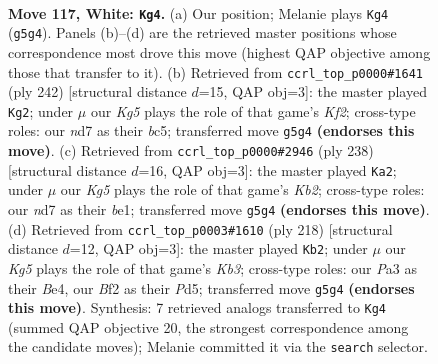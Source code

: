 \documentclass[11pt]{article}
\begin{document}
\clearpage

\begin{figure}[p]\centering
\begin{subfigure}{0.46\textwidth}\centering
\resizebox{\linewidth}{!}{%
\newchessgame
\chessboard[
  setfen={7k/3n4/8/5PK1/p6P/P7/5B2/8 w - - 1 117},
  showmover=false,
  pgfstyle=straightmove, color=movearrow, markmove={g5-g4}
]}
\caption{}
\end{subfigure}\hfill
\begin{subfigure}{0.46\textwidth}\centering
\resizebox{\linewidth}{!}{%
\newchessgame
\chessboard[
  setfen={8/8/5k2/2b3p1/4B3/5PPP/5K2/8 w - - 61 122},
  showmover=false,
  pgfstyle=straightmove, color=movearrow, markmove={f2-g2}
]}
\caption{}
\end{subfigure}
\\[4pt]
\begin{subfigure}{0.46\textwidth}\centering
\resizebox{\linewidth}{!}{%
\newchessgame
\chessboard[
  setfen={8/k7/8/3B4/7p/P6P/1K4P1/4b3 w - - 73 120},
  showmover=false,
  pgfstyle=straightmove, color=movearrow, markmove={b2-a2}
]}
\caption{}
\end{subfigure}\hfill
\begin{subfigure}{0.46\textwidth}\centering
\resizebox{\linewidth}{!}{%
\newchessgame
\chessboard[
  setfen={8/8/1k1p4/3P4/1P2Bp1b/1KP5/8/8 w - - 25 110},
  showmover=false,
  pgfstyle=straightmove, color=movearrow, markmove={b3-b2}
]}
\caption{}
\end{subfigure}
\caption{\textbf{Move 117, White: \texttt{Kg4}.} (a) Our position; Melanie plays \texttt{Kg4} (\texttt{g5g4}). Panels (b)--(d) are the retrieved master positions whose correspondence most drove this move (highest QAP objective among those that transfer to it). (b) Retrieved from \texttt{ccrl\_top\_p0000\#1641} (ply 242) [structural distance $d$=15, QAP obj=3]: the master played \texttt{Kg2}; under $\mu$ our \emph{Kg5} plays the role of that game's \emph{Kf2}; cross-type roles: our \emph{n}d7 as their \emph{b}c5; transferred move \texttt{g5g4} \textbf{(endorses this move)}. (c) Retrieved from \texttt{ccrl\_top\_p0000\#2946} (ply 238) [structural distance $d$=16, QAP obj=3]: the master played \texttt{Ka2}; under $\mu$ our \emph{Kg5} plays the role of that game's \emph{Kb2}; cross-type roles: our \emph{n}d7 as their \emph{b}e1; transferred move \texttt{g5g4} \textbf{(endorses this move)}. (d) Retrieved from \texttt{ccrl\_top\_p0003\#1610} (ply 218) [structural distance $d$=12, QAP obj=3]: the master played \texttt{Kb2}; under $\mu$ our \emph{Kg5} plays the role of that game's \emph{Kb3}; cross-type roles: our \emph{P}a3 as their \emph{B}e4, our \emph{B}f2 as their \emph{P}d5; transferred move \texttt{g5g4} \textbf{(endorses this move)}. Synthesis: 7 retrieved analogs transferred to \texttt{Kg4} (summed QAP objective 20, the strongest correspondence among the candidate moves); Melanie committed it via the \texttt{search} selector.}
\label{fig:thought-m232}
\end{figure}
\end{document}
